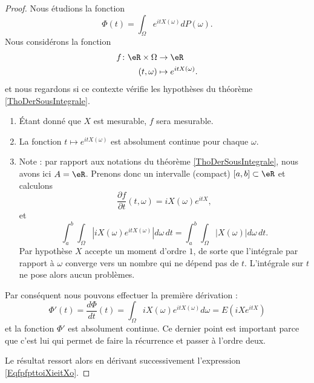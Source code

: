 \begin{proof}
    Nous étudions la fonction
    \begin{equation}
        \Phi(t)=\int_{\Omega} e^{itX(\omega)}dP(\omega).
    \end{equation}
    Nous considérons la fonction
    \begin{equation}
        \begin{aligned}
            f\colon \eR\times\Omega&\to \eR \\
            (t,\omega)&\mapsto  e^{itX(\omega)}. 
        \end{aligned}
    \end{equation}
    et nous regardons si ce contexte vérifie les hypothèses du théorème \ref{ThoDerSousIntegrale}.
    \begin{enumerate}
        \item
            Étant donné que \( X\) est mesurable, \( f\) sera mesurable.
        \item
            La fonction \( t\mapsto e^{itX(\omega)}\) est absolument continue pour chaque \( \omega\).
        \item
            Note : par rapport aux notations du théorème \ref{ThoDerSousIntegrale}, nous avons ici \( A=\eR\). Prenons donc un intervalle (compact) \( \mathopen[ a , b \mathclose]\subset\eR\) et calculons
            \begin{equation}        \label{EqfpfpttoiXieitXo}
                \frac{ \partial f }{ \partial t }(t,\omega)=iX(\omega) e^{itX},
            \end{equation}
            et
            \begin{equation}
                \int_a^b\int_{\Omega}\left| iX(\omega) e^{itX(\omega)} \right| d\omega\,dt=\int_a^b\int_{\Omega}| X(\omega) |d\omega\,dt.
            \end{equation}
            Par hypothèse \( X\) accepte un moment d'ordre \( 1\), de sorte que l'intégrale par rapport à \( \omega\) converge vers un nombre qui ne dépend pas de \( t\). L'intégrale sur \( t\) ne pose alors aucun problèmes.
    \end{enumerate}
    Par conséquent nous pouvons effectuer la première dérivation :
    \begin{equation}
        \Phi'(t)=\frac{ d\Phi }{ dt }(t)=\int_{\Omega}iX(\omega) e^{itX(\omega)}d\omega=E(iX e^{itX})
    \end{equation}
    et la fonction \( \Phi'\) est absolument continue. Ce dernier point est important parce que c'est lui qui permet de faire la récurrence et passer à l'ordre deux.

    Le résultat ressort alors en dérivant successivement l'expression \eqref{EqfpfpttoiXieitXo}.
\end{proof}


